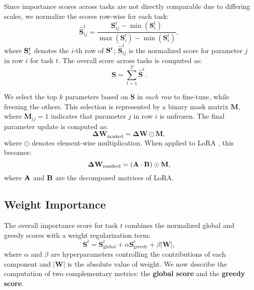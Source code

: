 Since importance scores across tasks are not directly comparable due to differing scales, we normalize the scores row-wise for each task:
\vspace{-5pt} 
\begin{equation}
\label{eq:rownorm}
\hat{\mathbf{S}}^t_{ij} = \frac{\mathbf{S}^t_{ij} - \min(\mathbf{S}^t_{i})}{\max(\mathbf{S}^t_{i}) - \min(\mathbf{S}^t_{i}) },
\end{equation}
where $\mathbf{S}_i^t$ denotes the $i$-th row of $\mathbf{S}^t$; $\hat{\mathbf{S}}^t_{ij}$ is the normalized score for parameter $j$ in row $i$ for task $t$. The overall score across tasks is computed as:
\vspace{-5pt} 
\begin{equation}
\mathbf{S} = \sum_{t=1}^T{\hat{\mathbf{S}}^t}.
\end{equation}

We select the top $k$ parameters based on $\mathbf{S}$ in {\it each row} to fine-tune, while freezing the others. This selection is represented by a binary mask matrix $\mathbf{M}$, where $\mathbf{M}_{ij} = 1$ indicates that parameter $j$ in row $i$ is unfrozen. The final parameter update is computed as:
\vspace{-8pt} 
\begin{equation}
\mathbf{\Delta W}_{\text{masked}} = \mathbf{\Delta W} \odot \mathbf{M},
\end{equation}
where $\odot$ denotes element-wise multiplication. When applied to LoRA \citep{hu2021lora}, this becomes:
\vspace{-8pt} 
\begin{equation}
\mathbf{\Delta W}_{\text{masked}} =  (\mathbf{A} \cdot \mathbf{B}) \odot \mathbf{M},
\end{equation}
where $\mathbf{A}$ and $\mathbf{B}$ are the decomposed matrices of LoRA. 



\subsection{Weight Importance}

The overall importance score for task $t$ combines the normalized global and greedy scores with a weight regularization term:
\vspace{-4pt} 
\begin{equation}
\mathbf{S}^t = \mathbf{S}^t_\text{global} +  \alpha \mathbf{S}^t_\text{greedy} + \beta |\mathbf{W}|,
\end{equation}
where $\alpha$ and $\beta$ are hyperparameters controlling the contributions of each component and $|\mathbf{W}|$ is the absolute value of weight. We now describe the computation of two complementary metrics: the \textbf{global score} and the \textbf{greedy score}.

